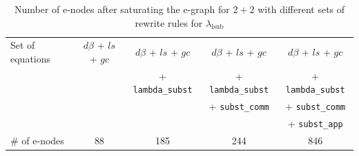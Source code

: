 \begin{table}
	\begin{tabular}{lcccc}
		Set of equations & $d\beta$ + $ls$ + $gc$ & $d\beta$ + $ls$ + $gc$   & $d\beta$ + $ls$ + $gc$   & $d\beta$ + $ls$ + $gc$   \\
		                 &                        & + \texttt{lambda\_subst} & + \texttt{lambda\_subst} & + \texttt{lambda\_subst} \\
		                 &                        &                          & + \texttt{subst\_comm}   & + \texttt{subst\_comm}   \\
		                 &                        &                          &                          & + \texttt{subst\_app}    \\
		\# of e-nodes    & 88                     & 185                      & 244                      & 846
	\end{tabular}
	\caption{Number of e-nodes after saturating the e-graph for $2 + 2$ with different sets of rewrite rules for $\lambda_{\text{lsub}}$}
	\label{tbl:slotted}
\end{table}


